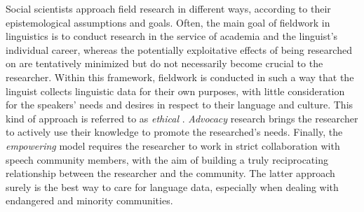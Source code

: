 \documentclass[output=paper]{langscibook}
\begin{document}
Social scientists approach field research in different ways, according to their epistemological assumptions and goals. Often, the main goal of fieldwork in linguistics is to conduct research in the service of academia and the linguist’s individual career, whereas the potentially exploitative effects of being researched on are tentatively minimized but do not necessarily become crucial to the researcher. Within this framework, fieldwork is conducted in such a way that the linguist collects linguistic data for their own purposes, with little consideration for the speakers’ needs and desires in respect to their language and culture. This kind of approach is referred to as \textit{ethical} \citep[15]{cameron_researching_1992}. \textit{Advocacy} research \citep[15]{cameron_researching_1992} brings the researcher to actively use their knowledge to promote the researched’s needs. Finally, the \textit{empowering} model \citep[22]{cameron_researching_1992} requires the researcher to work in strict collaboration with speech community members, with the aim of building a truly reciprocating relationship between the researcher and the community. The latter approach surely is the best way to care for language data, especially when dealing with endangered and minority communities. 
\end{document}
